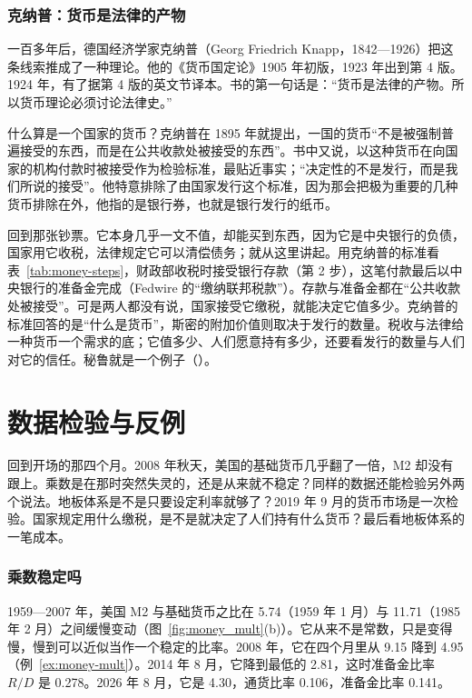 \subsubsection{克纳普：货币是法律的产物}
一百多年后，德国经济学家克纳普（Georg Friedrich Knapp，1842—1926）把这条线索推成了一种理论。他的《货币国定论》1905 年初版，1923 年出到第 4 版。1924 年，有了据第 4 版的英文节译本\cite{knapp1924}。书的第一句话是：“货币是法律的产物。所以货币理论必须讨论法律史。”\cite{knapp1924}

什么算是一个国家的货币？克纳普在 1895 年就提出，一国的货币“不是被强制普遍接受的东西，而是在公共收款处被接受的东西”。书中又说，以这种货币在向国家的机构付款时被接受作为检验标准，最贴近事实；“决定性的不是发行，而是我们所说的接受”。他特意排除了由国家发行这个标准，因为那会把极为重要的几种货币排除在外，他指的是银行券，也就是银行发行的纸币\cite{knapp1924}。

回到那张钞票。它本身几乎一文不值，却能买到东西，因为它是中央银行的负债，国家用它收税，法律规定它可以清偿债务；就从这里讲起。用克纳普的标准看表~\ref{tab:money-steps}，财政部收税时接受银行存款（第 2 步），这笔付款最后以中央银行的准备金完成（Fedwire 的“缴纳联邦税款”）。存款与准备金都在“公共收款处被接受”。可是两人都没有说，国家接受它缴税，就能决定它值多少。克纳普的标准回答的是“什么是货币”，斯密的附加价值则取决于发行的数量。税收与法律给一种货币一个需求的底；它值多少、人们愿意持有多少，还要看发行的数量与人们对它的信任。秘鲁就是一个例子（）。

\section{数据检验与反例}\label{sec:money-test}

回到开场的那四个月。2008 年秋天，美国的基础货币几乎翻了一倍，M2 却没有跟上。乘数是在那时突然失灵的，还是从来就不稳定？同样的数据还能检验另外两个说法。地板体系是不是只要设定利率就够了？2019 年 9 月的货币市场是一次检验。国家规定用什么缴税，是不是就决定了人们持有什么货币？最后看地板体系的一笔成本。

\subsubsection{乘数稳定吗}
1959—2007 年，美国 M2 与基础货币之比在 5.74（1959 年 1 月）与 11.71（1985 年 2 月）之间缓慢变动（图~\ref{fig:money_mult}(b)）。它从来不是常数，只是变得慢，慢到可以近似当作一个稳定的比率。2008 年，它在四个月里从 9.15 降到 4.95（例~\ref{ex:money-mult}）。2014 年 8 月，它降到最低的 2.81，这时准备金比率 $R/D$ 是 0.278。2026 年 8 月，它是 4.30，通货比率 0.106，准备金比率 0.141\cite{fred2026m}。

